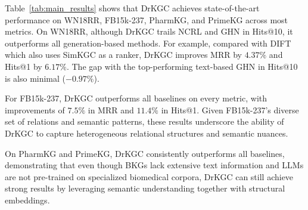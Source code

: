 \documentclass[11pt]{article}
\begin{document}
Table~\ref{tab:main_results} shows that DrKGC achieves state-of-the-art performance on WN18RR, FB15k-237, PharmKG, and PrimeKG across most metrics. On WN18RR, although DrKGC trails NCRL and GHN in Hits@10, it outperforms all generation-based methods. For example, compared with DIFT \citep{liu2024finetuninggenerativelargelanguage} which also uses SimKGC as a ranker, DrKGC improves MRR by $4.37\%$ and Hits@1 by $6.17\%$. The gap with the top-performing text-based GHN in Hits@10 is also minimal ($-0.97\%$).  

For FB15k-237, DrKGC outperforms all baselines on every metric, with improvements of $7.5\%$ in MRR and $11.4\%$ in Hits@1. Given FB15k-237’s diverse set of relations and semantic patterns, these results underscore the ability of DrKGC to capture heterogeneous relational structures and semantic nuances.   

On PharmKG and PrimeKG, DrKGC consistently outperforms all baselines, demonstrating that even though BKGs lack extensive text information and LLMs are not pre-trained on specialized biomedical corpora, DrKGC can still achieve strong results by leveraging semantic understanding together with structural embeddings.


\end{document}
